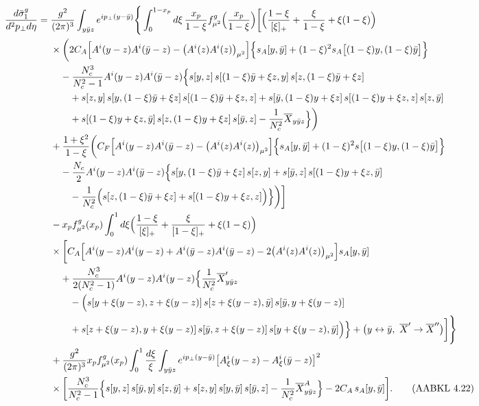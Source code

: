\documentclass[10pt]{article}
\numberwithin{equation}{section}
\begin{document}
\begin{align}
\frac{d\bar\sigma^g_1}{d^2p_\perp d\eta}={}&\frac{g^2}{(2\pi)^3}\int_{y\bar yz}e^{ip_\perp(y-\bar y)}\Bigg\{\int_0^{1-x_p}d\xi\,\frac{x_p}{1-\xi}f^g_{\mu^2}\Big(\frac{x_p}{1-\xi}\Big)\bigg[\Big(\frac{1-\xi}{[\xi]_+}+\frac{\xi}{1-\xi}+\xi(1-\xi)\Big)\notag\\
&\times\bigg(2C_A\Big[A^i(y-z)A^i(\bar y-z)-\big(A^i(z)A^i(z)\big)_{\mu^2}\Big]\Big\{s_A[y,\bar y]+(1-\xi)^2s_A\big[(1-\xi)y,(1-\xi)\bar y\big]\Big\}\notag\\
&\quad-\frac{N_c^3}{N_c^2-1}A^i(y-z)A^i(\bar y-z)\Big\{s[y,z]\,s[(1-\xi)\bar y+\xi z,y]\,s[z,(1-\xi)\bar y+\xi z]\notag\\
&\qquad+s[z,y]\,s[y,(1-\xi)\bar y+\xi z]\,s[(1-\xi)\bar y+\xi z,z]+s[\bar y,(1-\xi)y+\xi z]\,s[(1-\xi)y+\xi z,z]\,s[z,\bar y]\notag\\
&\qquad+s[(1-\xi)y+\xi z,\bar y]\,s[z,(1-\xi)y+\xi z]\,s[\bar y,z]-\frac{1}{N_c^2}\overline X_{y\bar yz}\Big\}\bigg)\notag\\
&+\frac{1+\xi^2}{1-\xi}\bigg(C_F\Big[A^i(y-z)A^i(\bar y-z)-\big(A^i(z)A^i(z)\big)_{\mu^2}\Big]\Big\{s_A[y,\bar y]+(1-\xi)^2s\big[(1-\xi)y,(1-\xi)\bar y\big]\Big\}\notag\\
&\quad-\frac{N_c}{2}A^i(y-z)A^i(\bar y-z)\Big\{s[y,(1-\xi)\bar y+\xi z]\,s[z,y]+s[\bar y,z]\,s[(1-\xi)y+\xi z,\bar y]\notag\\
&\qquad-\frac{1}{N_c^2}\Big(s[z,(1-\xi)\bar y+\xi z]+s[(1-\xi)y+\xi z,z]\Big)\Big\}\bigg)\bigg]\notag\\
&-x_pf^g_{\mu^2}(x_p)\int_0^1d\xi\Big(\frac{1-\xi}{[\xi]_+}+\frac{\xi}{[1-\xi]_+}+\xi(1-\xi)\Big)\notag\\
&\times\bigg[C_A\Big[A^i(y-z)A^i(y-z)+A^i(\bar y-z)A^i(\bar y-z)-2\big(A^i(z)A^i(z)\big)_{\mu^2}\Big]s_A[y,\bar y]\notag\\
&\quad+\frac{N_c^3}{2(N_c^2-1)}A^i(y-z)A^i(y-z)\Big\{\frac{1}{N_c^2}\overline X'_{y\bar yz}\notag\\
&\qquad-\Big(s[y+\xi(y-z),z+\xi(y-z)]\,s[z+\xi(y-z),\bar y]\,s[\bar y,y+\xi(y-z)]\notag\\
&\qquad+s[z+\xi(y-z),y+\xi(y-z)]\,s[\bar y,z+\xi(y-z)]\,s[y+\xi(y-z),\bar y]\Big)\Big\}+\big(y\leftrightarrow\bar y,\ \overline X'\to\overline X''\big)\bigg]\Bigg\}\notag\\
&+\frac{g^2}{(2\pi)^3}x_pf^g_{\mu^2}(x_p)\int_0^1\frac{d\xi}{\xi}\int_{y\bar yz}e^{ip_\perp(y-\bar y)}\big[A^i_\xi(y-z)-A^i_\xi(\bar y-z)\big]^2\notag\\
&\times\bigg[\frac{N_c^3}{N_c^2-1}\Big\{s[y,z]\,s[\bar y,y]\,s[z,\bar y]+s[z,y]\,s[y,\bar y]\,s[\bar y,z]-\frac{1}{N_c^2}\overline X^A_{y\bar yz}\Big\}-2C_A\,s_A[y,\bar y]\bigg].
\tag{AABKL 4.22}
\end{align}
\end{document}
